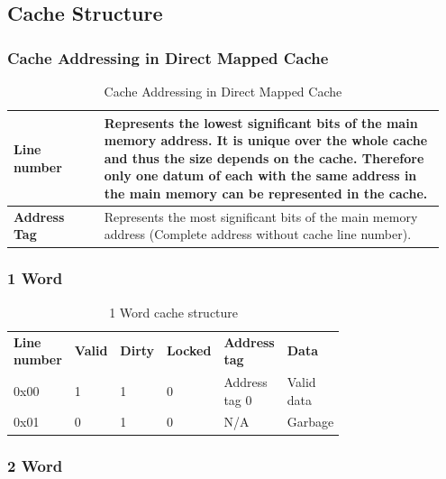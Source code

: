 	\subsection{Cache Structure }
		\subsubsection{Cache Addressing in Direct Mapped Cache}
			\begin{table}[H]
				\centering
				\begin{tabular}{|>{\bfseries}p{0.2\linewidth}|p{0.75\linewidth}|}
					\hline
					Line number
						& Represents the lowest significant bits of the main memory address. It is unique over the whole cache and thus the size depends on the cache. Therefore only one datum of each with the same address in the main memory can be represented in the cache.\\
					\hline
					Address Tag
						& Represents the most significant bits of the main memory address (Complete address without cache line number).\\
					\hline
				\end{tabular}
				\caption{Cache Addressing in Direct Mapped Cache}
			\end{table} 
			
		\subsubsection {1 Word}
		
			\begin{table}[H]
				\centering
				\begin{tabular}{p{0.15\linewidth}|p{0.06\linewidth}|p{0.06\linewidth}|p{0.06\linewidth}|p{0.2\linewidth}|p{0.2\linewidth}|}
					\cline{2-6}
						\textbf{Line number}
							& \textbf{Valid}
							& \textbf{Dirty}
							& \textbf{Locked}
							& \textbf{Address tag}
							& \textbf{Data}\\
					\cline{2-6}
						0x00
							& 1
							& 1
							& 0
							& Address tag 0
							& Valid data\\
					\cline{2-6}
						0x01
							& 0
							& 1
							& 0
							& N/A
							& Garbage\\
					\cline{2-6}
				\end{tabular}
				\caption{1 Word cache structure}
			\end{table}	
			
		\subsubsection {2 Word}
		
